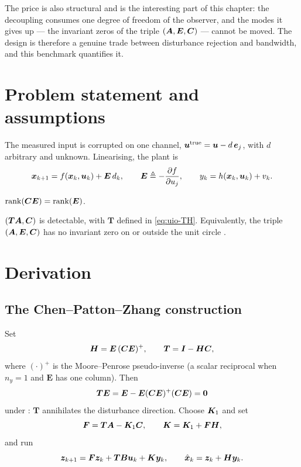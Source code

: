 The price is also structural and is the interesting part of this chapter: the decoupling consumes
one degree of freedom of the observer, and the modes it gives up --- the invariant zeros of the
triple $(\bm{A},\bm{E},\bm{C})$ --- cannot be moved.  The design is therefore a genuine trade between
disturbance rejection and bandwidth, and this benchmark quantifies it.

\section{Problem statement and assumptions}
The measured input is corrupted on one channel, $\bm{u}^{\mathrm{true}} = \bm{u} - d\,\bm{e}_j$, with
$d$ arbitrary and unknown.  Linearising, the plant is
\begin{equation}
\bm{x}_{k+1} = f(\bm{x}_k,\bm{u}_k) + \bm{E}\,d_k , \qquad
\bm{E} \triangleq -\frac{\partial f}{\partial u_j} , \qquad
y_k = h(\bm{x}_k,\bm{u}_k) + v_k .
\label{eq:uio-plant}
\end{equation}
\begin{assumption}\label{as:uio-rank}
$\operatorname{rank}(\bm{C}\bm{E}) = \operatorname{rank}(\bm{E})$.
\end{assumption}
\begin{assumption}\label{as:uio-det}
$(\bm{T}\bm{A},\bm{C})$ is detectable, with $\bm{T}$ defined in \eqref{eq:uio-TH}.  Equivalently, the triple
$(\bm{A},\bm{E},\bm{C})$ has no invariant zero on or outside the unit circle
\cite[Ch.~3]{chenpatton1999}.
\end{assumption}

\section{Derivation}

\subsection{The Chen--Patton--Zhang construction}
Set
\begin{equation}
\bm{H} = \bm{E}\,(\bm{C}\bm{E})^{+} , \qquad \bm{T} = \bm{I} - \bm{H}\bm{C} ,
\label{eq:uio-TH}
\end{equation}
where $(\cdot)^+$ is the Moore--Penrose pseudo-inverse (a scalar reciprocal when $n_y=1$ and
$\bm{E}$ has one column).  Then
\begin{equation}
\bm{T}\bm{E} = \bm{E} - \bm{E}(\bm{C}\bm{E})^{+}(\bm{C}\bm{E}) = \bm{0}
\label{eq:uio-TE}
\end{equation}
under : $\bm{T}$ annihilates the disturbance direction.  Choose $\bm{K}_1$ and set
\begin{equation}
\bm{F} = \bm{T}\bm{A} - \bm{K}_1\bm{C} , \qquad \bm{K} = \bm{K}_1 + \bm{F}\bm{H} ,
\label{eq:uio-FK}
\end{equation}
and run
\begin{equation}
\bm{z}_{k+1} = \bm{F}\bm{z}_k + \bm{T}\bm{B}\bm{u}_k + \bm{K}\bm{y}_k , \qquad
\hat{\bm{x}}_k = \bm{z}_k + \bm{H}\bm{y}_k .
\label{eq:uio-rec}
\end{equation}

